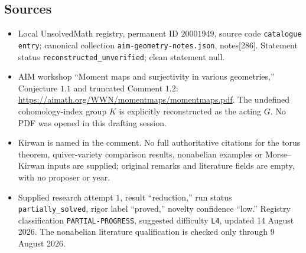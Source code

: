 \documentclass[11pt]{article}
\begin{document}
\subsection{Sources}
\begin{itemize}
\item Local UnsolvedMath registry, permanent ID \(20001949\), source code \texttt{catalogue entry}; canonical collection \texttt{aim-geometry-notes.json}, notes[286]. Statement status \texttt{reconstructed\_unverified}; clean statement null.
\item AIM workshop ``Moment maps and surjectivity in various geometries,'' Conjecture \(1.1\) and truncated Comment \(1.2\): \url{https://aimath.org/WWN/momentmaps/momentmaps.pdf}. The undefined cohomology-index group \(K\) is explicitly reconstructed as the acting \(G\). No PDF was opened in this drafting session.
\item Kirwan is named in the comment. No full authoritative citations for the torus theorem, quiver-variety comparison results, nonabelian examples or Morse--Kirwan inputs are supplied; original remarks and literature fields are empty, with no proposer or year.
\item Supplied research attempt \(1\), result ``reduction,'' run status \texttt{partially\_solved}, rigor label ``proved,'' novelty confidence ``low.'' Registry classification \texttt{PARTIAL-PROGRESS}, suggested difficulty \texttt{L4}, updated 14 August 2026. The nonabelian literature qualification is checked only through 9 August 2026.
\end{itemize}
\end{document}
